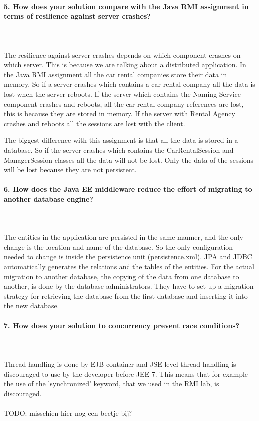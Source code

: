 \documentclass{ds-report}
\begin{document}
	\paragraph{5. How does your solution compare with the Java RMI assignment in terms of resilience against server crashes?} \mbox{}\\\\
The resilience against server crashes depends on which component crashes on which server. This is because we are talking about a distributed application. In the Java RMI assignment all the car rental companies store their data in memory. So if a server crashes which contains a car rental company all the data is lost when the server reboots. If the server which contains the Naming Service component crashes and reboots, all the car rental company references are lost, this is because they are stored in memory. If the server with Rental Agency crashes and reboots all the sessions are lost with the client.

The biggest difference with this assignment is that all the data is stored in a database. So if the server crashes which contains the CarRentalSession and ManagerSession classes all the data will not be lost. Only the data of the sessions will be lost because they are not persistent. 


		\paragraph{6. How does the Java EE middleware reduce the effort of migrating to another database engine?} \mbox{}\\\\
The entities in the application are persisted in the same manner, and the only change is the location and name of the database. So the only configuration needed to change is inside the persistence unit (persistence.xml). JPA and JDBC automatically generates the relations and the tables of the entities.  
For the actual migration to another database, the copying of the data from one database to another, is done by the database administrators. They have to set up a migration strategy for retrieving the database from the first database and inserting it into the new database. 

 

	\paragraph{7. How does your solution to concurrency prevent race conditions?} \mbox{}\\\\
Thread handling is done by EJB container and JSE-level thread handling is discouraged to use by the developer before JEE 7. This means that for example the use of the 'synchronized' keyword, that we used in the RMI lab, is discouraged.\mbox{}\\\\
TODO: misschien hier nog een beetje bij?
\end{document}
